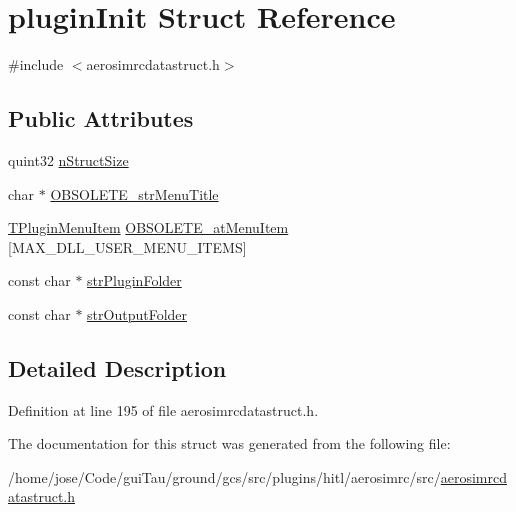 \hypertarget{structplugin_init}{\section{plugin\-Init Struct Reference}
\label{structplugin_init}
}


{\ttfamily \#include $<$aerosimrcdatastruct.\-h$>$}

\subsection*{Public Attributes}
\begin{DoxyCompactItemize}
\item 
quint32 \hyperlink{group___aero_sim_r_c_ga52e8965004a5543170823fdb54bee470}{n\-Struct\-Size}
\item 
char $\ast$ \hyperlink{group___aero_sim_r_c_ga03438bb42beb3367394a89c5f8b0d721}{O\-B\-S\-O\-L\-E\-T\-E\-\_\-str\-Menu\-Title}
\item 
\hyperlink{struct_t_plugin_menu_item}{T\-Plugin\-Menu\-Item} \hyperlink{group___aero_sim_r_c_ga587ecda1e1922299d622d31bf15c9f78}{O\-B\-S\-O\-L\-E\-T\-E\-\_\-at\-Menu\-Item} \mbox{[}M\-A\-X\-\_\-\-D\-L\-L\-\_\-\-U\-S\-E\-R\-\_\-\-M\-E\-N\-U\-\_\-\-I\-T\-E\-M\-S\mbox{]}
\item 
const char $\ast$ \hyperlink{group___aero_sim_r_c_ga1ea4ae7485e88859f164a5e904600834}{str\-Plugin\-Folder}
\item 
const char $\ast$ \hyperlink{group___aero_sim_r_c_ga9149810daf40b3b4e5f706faaa8dcc8f}{str\-Output\-Folder}
\end{DoxyCompactItemize}


\subsection{Detailed Description}


Definition at line 195 of file aerosimrcdatastruct.\-h.



The documentation for this struct was generated from the following file\-:\begin{DoxyCompactItemize}
\item 
/home/jose/\-Code/gui\-Tau/ground/gcs/src/plugins/hitl/aerosimrc/src/\hyperlink{aerosimrcdatastruct_8h}{aerosimrcdatastruct.\-h}\end{DoxyCompactItemize}
